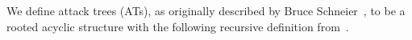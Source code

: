 
We define attack trees (ATs), as originally described by Bruce Schneier~\cite{schneierAttackTrees1999}, to be a rooted acyclic structure with the following recursive definition from~\cite{gadyatskayaRefinementAwareGenerationAttack2017}.

